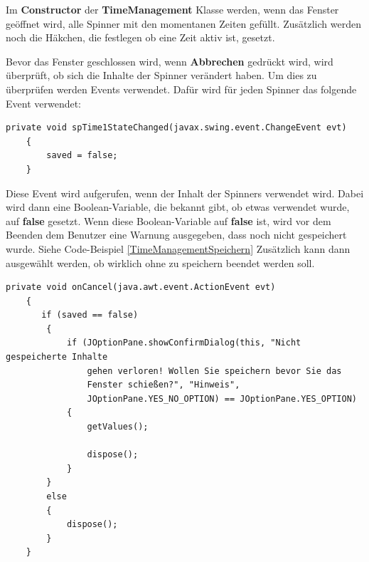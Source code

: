 \vspace{10pt}

Im \textbf{Constructor} der \textbf{TimeManagement} Klasse werden, wenn das Fenster geöffnet wird, alle Spinner mit den momentanen Zeiten gefüllt. Zusätzlich werden noch die Häkchen, die festlegen ob eine Zeit aktiv ist, gesetzt.

\vspace{10pt}

Bevor das Fenster geschlossen wird, wenn \textbf{Abbrechen} gedrückt wird, wird überprüft, ob sich die Inhalte der Spinner verändert haben. Um dies zu überprüfen werden Events verwendet. Dafür wird für jeden Spinner das folgende Event verwendet:

\newpage

\begin{lstlisting}[style=JavaStyle, caption=Spinner Event]
    private void spTime1StateChanged(javax.swing.event.ChangeEvent evt)                                     
    {                                         
        saved = false;
    }   
\end{lstlisting} 
Diese Event wird aufgerufen, wenn der Inhalt der Spinners verwendet wird. Dabei wird dann eine Boolean-Variable, die bekannt gibt, ob etwas verwendet wurde, auf \textbf{false} gesetzt. Wenn diese Boolean-Variable auf \textbf{false} ist, wird vor dem Beenden dem Benutzer eine Warnung ausgegeben, dass noch nicht gespeichert wurde. Siehe Code-Beispiel \ref{TimeManagementSpeichern} Zusätzlich kann dann ausgewählt werden, ob wirklich ohne zu speichern beendet werden soll.

\begin{lstlisting}[style=Javastyle, caption=TimeManagement Fenster schließen, label=TimeManagementSpeichern]
 private void onCancel(java.awt.event.ActionEvent evt)                          
    {                              
       if (saved == false)
        {
            if (JOptionPane.showConfirmDialog(this, "Nicht gespeicherte Inhalte 
            	gehen verloren! Wollen Sie speichern bevor Sie das 
            	Fenster schießen?", "Hinweis", 
            	JOptionPane.YES_NO_OPTION) == JOptionPane.YES_OPTION)
            {
                getValues();
                
                dispose();
            }
        }
        else
        {
            dispose();
        }
    }
\end{lstlisting}

\vspace{10pt}

